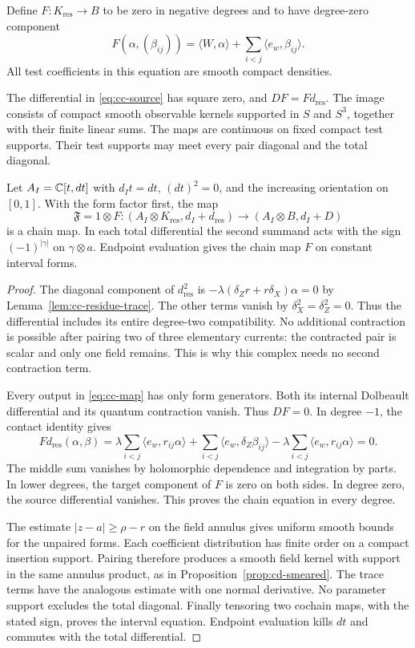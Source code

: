 Define $F:K_{\mathrm{res}}\to B$ to be zero in negative degrees and
to have degree-zero component
\begin{equation}
\label{eq:cc-map}
 F(\alpha,(\beta_{ij}))
    =\langle W,\alpha\rangle+
               \sum_{i<j}\langle e_w,\beta_{ij}\rangle.
\end{equation}
All test coefficients in this equation are smooth compact densities.

\begin{theorem}
\label{thm:cc-residue-comparison}
The differential in \eqref{eq:cc-source} has square zero, and
$DF=F d_{\mathrm{res}}$.
The image consists of compact smooth observable kernels supported in
$S$ and $S^3$, together with their finite linear sums.
The maps are continuous on fixed compact test supports.
Their test supports may meet every pair diagonal and the total diagonal.

Let $A_I=\mathbb C[t,dt]$ with $d_It=dt$, $(dt)^2=0$, and the increasing
orientation on $[0,1]$.  With the form factor first, the map
\[
 \mathfrak F=1\otimes F:
 (A_I\otimes K_{\mathrm{res}},d_I+d_{\mathrm{res}})
       \longrightarrow (A_I\otimes B,d_I+D)
\]
is a chain map.  In each total differential the second summand acts with
the sign $(-1)^{|\gamma|}$ on $\gamma\otimes a$.
Endpoint evaluation gives the chain map $F$ on constant interval forms.
\end{theorem}
\begin{proof}
The diagonal component of $d_{\mathrm{res}}^2$ is
$-\lambda(\delta_Zr+r\delta_X)\alpha=0$ by
Lemma~\ref{lem:cc-residue-trace}.  The other terms vanish by
$\delta_X^2=\delta_Z^2=0$.
Thus the differential includes its entire degree-two compatibility.
No additional contraction is possible after pairing two of three
elementary currents: the contracted pair is scalar and only one field
remains.  This is why this complex needs no second contraction term.

Every output in \eqref{eq:cc-map} has only form generators.  Both its
internal Dolbeault differential and its quantum contraction vanish.
Thus $DF=0$.
In degree $-1$, the contact identity gives
\[
 Fd_{\mathrm{res}}(\alpha,\beta)
 =\lambda\sum_{i<j}\langle e_w,r_{ij}\alpha\rangle
  +\sum_{i<j}\langle e_w,\delta_Z\beta_{ij}\rangle
  -\lambda\sum_{i<j}\langle e_w,r_{ij}\alpha\rangle=0.
\]
The middle sum vanishes by holomorphic dependence and integration by
parts.  In lower degrees, the target component of $F$ is zero on both
sides.  In degree zero, the source differential vanishes.
This proves the chain equation in every degree.

The estimate $|z-a|\ge\rho-r$ on the field annulus gives uniform smooth
bounds for the unpaired forms.  Each coefficient distribution has finite
order on a compact insertion support.
Pairing therefore produces a smooth field kernel with support in the
same annulus product, as in Proposition~\ref{prop:cd-smeared}.
The trace terms have the analogous estimate with one normal derivative.
No parameter support excludes the total diagonal.
Finally tensoring two cochain maps, with the stated sign, proves the
interval equation.  Endpoint evaluation kills $dt$ and commutes with
the total differential.
\end{proof}

